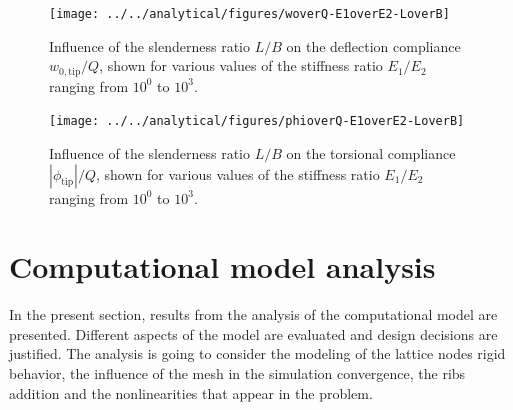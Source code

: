     \begin{figure}[!htpb] %
      \centering
      \texttt{[image: ../../analytical/figures/woverQ-E1overE2-LoverB]}
      \caption[Influence of the slenderness ratio $L/B$ on the deflection compliance]{Influence of the slenderness ratio $L/B$ on the deflection compliance $w_{\mathrm{0,tip}} / Q$, shown for various values of the stiffness ratio $E_1/E_2$ ranging from $10^0$ to $10^3$. }\label{fig:woverQ-E1overE2-LoverB}
    \end{figure}

    \begin{figure}[!htpb] %
      \centering
      \texttt{[image: ../../analytical/figures/phioverQ-E1overE2-LoverB]}
      \caption[Influence of the slenderness ratio $L/B$ on the torsional compliance]{Influence of the slenderness ratio $L/B$ on the torsional compliance $|\phi_{\mathrm{tip}}| / Q$, shown for various values of the stiffness ratio $E_1/E_2$ ranging from $10^0$ to $10^3$. }\label{fig:phioverQ-E1overE2-LoverB}
    \end{figure}

\clearpage
\section{Computational model analysis} \label{sec:computationalModelAnalysis_results_model}

  In the present section, results from the analysis of the computational model are presented. Different aspects of the model are evaluated and design decisions are justified. The analysis is going to consider the modeling of the lattice nodes rigid behavior, the influence of the mesh in the simulation convergence, the ribs addition and the nonlinearities that appear in the problem.

